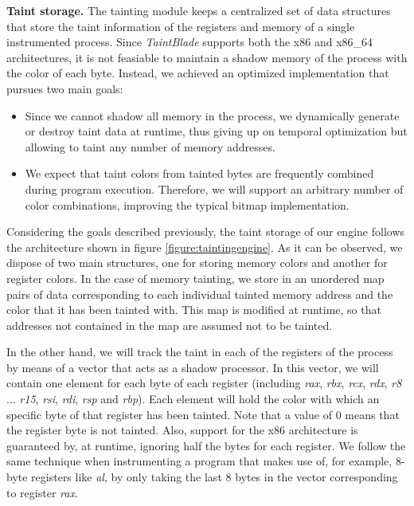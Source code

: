 \documentclass[conference]{IEEEtran}
\begin{document}
\textbf{Taint storage.} The tainting module keeps a centralized set
of data structures that store the taint information of the registers and memory of
a single instrumented process.
Since \textit{TaintBlade} supports both the x86 and x86\_64 architectures, it is not feasiable to
maintain a shadow memory of the process with the color of each byte. Instead, we
achieved an optimized implementation that pursues two main goals:
\begin{itemize}
    \item Since we cannot shadow all memory in the process, we dynamically generate or
          destroy taint data at runtime, thus giving up on temporal optimization but
          allowing to taint any number of memory addresses.
    \item We expect that taint colors from tainted bytes are frequently combined during
          program execution. Therefore, we will support an arbitrary number of color
          combinations, improving the typical bitmap implementation.
\end{itemize}

Considering the goals described previously, the taint storage of our engine
follows the architecture shown in figure \ref{figure:taintingengine}. As it can
be observed, we dispose of two main structures, one for storing memory colors
and another for register colors. In the case of memory tainting, we store in an
unordered map pairs of data corresponding to each individual tainted memory
address and the color that it has been tainted with. This map is modified at
runtime, so that addresses not contained in the map are assumed not to be
tainted.

In the other hand, we will track the taint in each of the registers of the
process by means of a vector that acts as a shadow processor. In this vector,
we will contain one element for each byte of each register (including
\textit{rax}, \textit{rbx}, \textit{rcx}, \textit{rdx}, \textit{r8} ...
\textit{r15}, \textit{rsi}, \textit{rdi}, \textit{rsp} and \textit{rbp}). Each
element will hold the color with which an specific byte of that register has
been tainted. Note that a value of 0 means that the register byte is not
tainted. Also, support for the x86 architecture is guaranteed by, at runtime,
ignoring half the bytes for each register. We follow the same technique when
instrumenting a program that makes use of, for example, 8-byte registers like
\textit{al}, by only taking the last 8 bytes in the vector corresponding to
register \textit{rax}.
\end{document}
